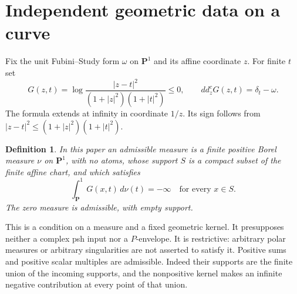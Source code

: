 \documentclass[11pt]{article}
\newtheorem{definition}[theorem]{Definition}
\theoremstyle{remark}\newtheorem{remark}[theorem]{Remark}
\newcommand{\ddc}{dd^c}
\newcommand{\PP}{\mathbf P^1}
\begin{document}
\section{Independent geometric data on a curve}
Fix the unit Fubini--Study form $\omega$ on $\PP$ and its affine
coordinate $z$. For finite $t$ set
\[
 G(z,t)=\log\frac{|z-t|^2}{(1+|z|^2)(1+|t|^2)}\leq0,\qquad
 \ddc_zG(z,t)=\delta_t-\omega.
 \tag{2.1}
\]
The formula extends at infinity in coordinate $1/z$. Its sign follows
from $|z-t|^2\leq(1+|z|^2)(1+|t|^2)$.

\begin{definition}
In this paper an admissible measure is a finite positive Borel measure
$\nu$ on $\PP$, with no atoms, whose support $S$ is a compact subset
of the finite affine chart, and which satisfies
\[
 \int_\PP G(x,t)\,d\nu(t)=-\infty\quad\text{for every }x\in S.
 \tag{2.2}
\]
The zero measure is admissible, with empty support.
\end{definition}
This is a condition on a measure and a fixed geometric kernel.
It presupposes neither a complex psh input nor a $P$-envelope.
It is restrictive: arbitrary polar measures or arbitrary singularities
are not asserted to satisfy it. Positive sums and positive scalar
multiples are admissible. Indeed their supports are the finite union
of the incoming supports, and the nonpositive kernel makes an infinite
negative contribution at every point of that union.
\end{document}
